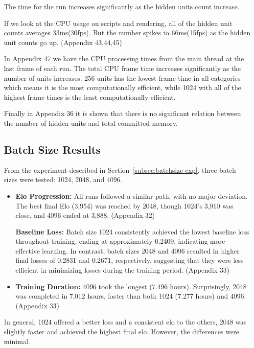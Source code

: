 \documentclass{LSkill}
\begin{document}
The time for the run increases significantly as the hidden units count increase.

If we look at the CPU usage on scripts and rendering, all of the hidden unit counts averages 33ms(30fps). But the number spikes to 66ms(15fps)  as the hidden unit counts go up. 
(Appendix 43,44,45)
\vspace{0.4cm}

In Appendix 47 we have the CPU processing times from the main thread at the last frame of each run. The total CPU frame time increases significantly as the number of units increases. 256 units has the lowest frame time in all categories which means it is the most computationally efficient, while 1024 with all of the highest frame times is the least computationally efficient.

Finally in Appendix 36 it is shown that there is no significant relation between the number of hidden units and total committed memory.

\subsection{Batch Size Results}
\label{subsec:batchsize-results}
From the experiment described in Section~\ref{subsec:batchsize-exp}, three batch sizes were tested: 1024, 2048, and 4096. 
\begin{itemize}
\item \textbf{Elo Progression:} All runs followed a similar path, with no major deviation. The best final Elo (3,954) was reached by 2048, though 1024’s 3,910 was close, and 4096 ended at 3,888. (Appendix 32)

\textbf{Baseline Loss:} Batch size 1024 consistently achieved the lowest baseline loss throughout training, ending at approximately 0.2409, indicating more effective learning. In contrast, batch sizes 2048 and 4096 resulted in higher final losses of 0.2831 and 0.2671, respectively, suggesting that they were less efficient in minimizing losses during the training period. (Appendix 33)

\item \textbf{Training Duration:} 4096 took the longest (7.496 hours). Surprisingly, 2048 was completed in 7.012 hours, faster than both 1024 (7.277 hours) and 4096. (Appendix 33)
\end{itemize}
In general, 1024 offered a better loss and a consistent elo to the others, 2048 was slightly faster and achieved the highest final elo. However, the differences were minimal.
\end{document}
